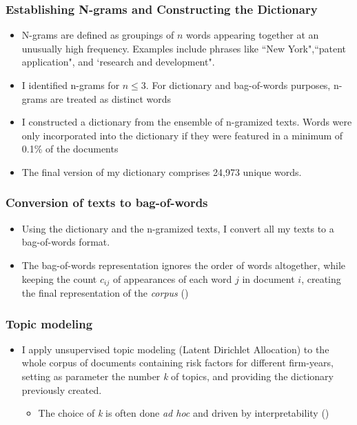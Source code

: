 \documentclass{beamer}
\begin{document}
\begin{frame}
\frametitle{Establishing N-grams and Constructing the Dictionary}
\label{ngram_main}
\begin{itemize}
\item N-grams are defined as groupings of $n$ words appearing together at an unusually high frequency. Examples include phrases like ``New York",``patent application", and `research and development".\hyperlink{ngram_details}{}

\item I identified n-grams for $n \leq 3$. For dictionary and bag-of-words purposes, n-grams are treated as distinct words
\item I constructed a dictionary from the ensemble of n-gramized texts. Words were only incorporated into the dictionary if they were featured in a minimum of 0.1\% of the documents %

\item The final version of my dictionary comprises 24,973 unique words. %
\end{itemize}
\normalsize
\end{frame}

\begin{frame}
\frametitle{Conversion of texts to bag-of-words}
\begin{itemize}
\item Using the dictionary and the n-gramized texts, I convert all my texts to a bag-of-words format.
\item The bag-of-words representation ignores the order of words altogether, while keeping the count $c_{ij}$ of appearances of each word $j$ in document $i$, creating the final representation of the \textit{corpus} (\cite{Gentzkow2019-va})
\end{itemize}
\end{frame}

\begin{frame}
\frametitle{Topic modeling}
\begin{itemize}
\item I apply unsupervised topic modeling (Latent Dirichlet Allocation) to the whole corpus of documents containing risk factors for different firm-years, setting as parameter the number \textit{k} of topics, and providing the dictionary previously created.
\begin{itemize}
  \item The choice of \textit{k} is often done \textit{ad hoc} and driven by interpretability (\cite{Gentzkow2019-va})
\end{itemize}
\end{itemize}
\end{frame}
\end{document}
